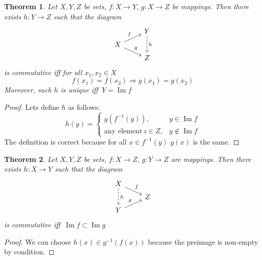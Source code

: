\documentclass[a4paper, 12pt]{article}
\newtheorem{thm}{Theorem}
\DeclareMathOperator{\Image}{Im}
\begin{document}
\begin{thm}\label{RelImages}
    Let $X, Y, Z$ be sets, $f:X\to Y,\,g:X\to Z$ be mappings. Then there exists $h: Y\to Z$ 
    such that the diagram
    \[
    \begin{tikzcd}[row sep = tiny]
                                          & Y \arrow[dd, dashrightarrow, "h"] \\
         X\arrow[ru, "f"] \arrow[rd, "g"] & \\
                                          & Z 
    \end{tikzcd}
    \]   
    is commutative iff for all $x_1, x_2\in X$
    \[
        f(x_1)=f(x_2) \Rightarrow g(x_1)=g(x_2) 
    \]
    Moreover, such $h$ is unique iff\, $Y=\Image f$ 
\end{thm}
\begin{proof}
    Lets define $h$ as follows:
    \[
        h(y) = 
        \begin{cases}
            g(f^{-1}(y)), & y\in \Image f\\
            \text{any element}\, z\in Z, & y\notin \Image f 
        \end{cases}
    \]
    The definition is correct because for all $x\in f^{-1}(y)$ $g(x)$ is the same.
\end{proof}

\begin{thm}
    Let $X, Y, Z$ be sets, $f:X\to Z,\,g:Y\to Z$ are mappings. 
    Then there exists $h: X\to Y$ such that the diagram
    \[
    \begin{tikzcd}[row sep = tiny]
        X\arrow[dd, dashrightarrow, "h"] \arrow[rd, "f"] &  \\
                                                         &  Z\\
        Y\arrow[ru, "g"] & 
    \end{tikzcd}
    \]   
    is commutative iff\, $\Image f \subset  \Image g$
\end{thm}
\begin{proof}
    We can choose $h(x) \in g^{-1}(f(x))$ because 
    the preimage is non-empty by condition.
\end{proof}
\end{document}
